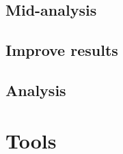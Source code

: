 	\subsection{Mid-analysis}
	\subsection{Improve results}
	\subsection{Analysis}
		


		

\section{Tools}




